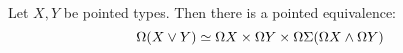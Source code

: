 


\begin{theorem}
    Let $X, Y$ be pointed types. Then there is a pointed equivalence:
    \begin{equation*}
        \Omega (X \vee Y) \simeq \Omega X \times \Omega Y \times \Omega \Sigma (\Omega X \wedge \Omega Y)
    \end{equation*}
\end{theorem}
